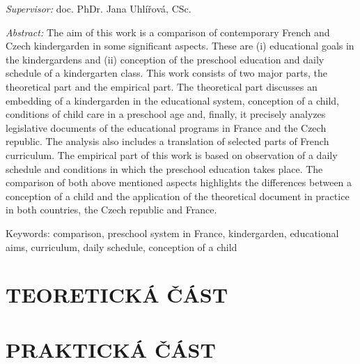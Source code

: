 \documentclass[12pt,a4paper,singleside,openright]{report}
\let\openright=\cleardoublepage
\newcommand{\mujVedouci}{doc. PhDr. Jana Uhlířová, CSc.}
\begin{document}
{	\emph{Supervisor:}
	\mujVedouci
\begin{spacing}{1.0}
	\emph{Abstract:}
	The aim of this work is a comparison of contemporary French and Czech kindergarden in some significant aspects. These are (i) educational goals in the kindergardens and (ii) conception of the preschool education and daily schedule of a kindergarten class. This work consists of two major parts, the theoretical part and the empirical part. 
	The theoretical part discusses an embedding of a kindergarden in the educational system, conception of a child, conditions of child care in a preschool age and, finally, it precisely analyzes legislative documents of the educational programs in France and the Czech republic. The analysis also includes a translation of selected parts of French curriculum. The empirical part of this work is based on observation of a daily schedule and conditions in which the preschool education takes place. The comparison of both above mentioned aspects highlights the differences between a conception of a child and the application of the theoretical document in practice in both countries, the Czech republic and France.
 

	Keywords:
	comparison, preschool system in France, kindergarden, educational aims, curriculum, daily schedule, conception of a child
\end{spacing}

	\vss}
\newpage


\openright
\pagestyle{plain}
\setcounter{page}{1}  %
\tableofcontents




\part{TEORETICKÁ ČÁST}






\part{PRAKTICKÁ ČÁST}


\end{document}
